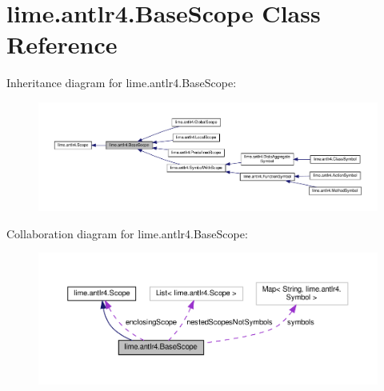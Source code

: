 \hypertarget{classlime_1_1antlr4_1_1BaseScope}{}\section{lime.\+antlr4.\+Base\+Scope Class Reference}
\label{classlime_1_1antlr4_1_1BaseScope}


Inheritance diagram for lime.\+antlr4.\+Base\+Scope\+:
\nopagebreak
\begin{figure}[H]
\begin{center}
\leavevmode
\includegraphics[width=350pt]{classlime_1_1antlr4_1_1BaseScope__inherit__graph}
\end{center}
\end{figure}


Collaboration diagram for lime.\+antlr4.\+Base\+Scope\+:
\nopagebreak
\begin{figure}[H]
\begin{center}
\leavevmode
\includegraphics[width=350pt]{classlime_1_1antlr4_1_1BaseScope__coll__graph}
\end{center}
\end{figure}
